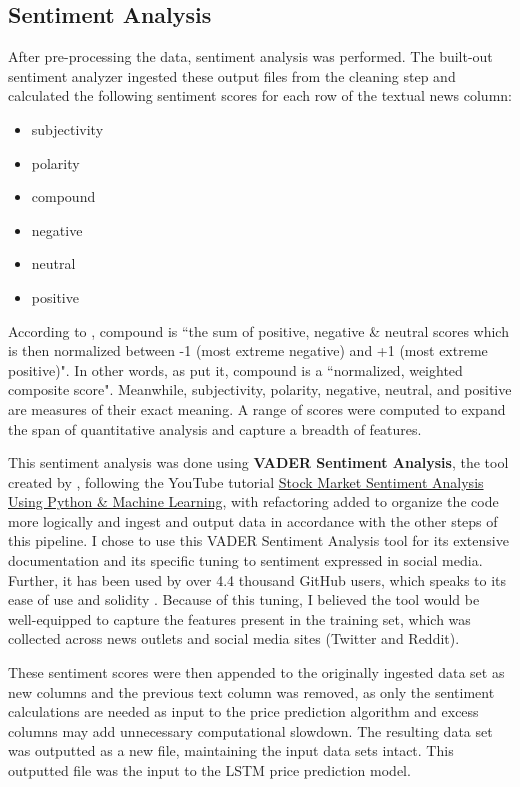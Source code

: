 \documentclass[10pt,twocolumn]{article}
\begin{document}
\subsection{Sentiment Analysis}

After pre-processing the data, sentiment analysis was performed. The built-out sentiment analyzer ingested these output files from the cleaning step and calculated the following sentiment scores for each row of the textual news column:

\begin{itemize}
    \item subjectivity
    \item polarity
    \item compound
    \item negative
    \item neutral
    \item positive
\end{itemize}

\noindent According to \textcite{sentimentanalysis}, compound is ``the sum of positive, negative \& neutral scores which is then normalized between -1 (most extreme negative) and +1 (most extreme positive)". In other words, as \textcite{vadersentiment} put it, compound is a ``normalized, weighted composite score". Meanwhile, subjectivity, polarity, negative, neutral, and positive are measures of their exact meaning. A range of scores were computed to expand the span of quantitative analysis and capture a breadth of features.

This sentiment analysis was done using \textbf{VADER Sentiment Analysis}, the tool created by \textcite{vadersentiment}, following the YouTube tutorial \href{https://www.youtube.com/watch?v=4OlvGGAsj8I}{Stock Market Sentiment Analysis Using Python \& Machine Learning}, with refactoring added to organize the code more logically and ingest and output data in accordance with the other steps of this pipeline. I chose to use this VADER Sentiment Analysis tool for its extensive documentation and its specific tuning to sentiment expressed in social media. Further, it has been used by over 4.4 thousand GitHub users, which speaks to its ease of use and solidity \cite{vadersentiment}. Because of this tuning, I believed the tool would be well-equipped to capture the features present in the training set, which was collected across news outlets and social media sites (Twitter and Reddit).

These sentiment scores were then appended to the originally ingested data set as new columns and the previous text column was removed, as only the sentiment calculations are needed as input to the price prediction algorithm and excess columns may add unnecessary computational slowdown. The resulting data set was outputted as a new file, maintaining the input data sets intact. This outputted file was the input to the LSTM price prediction model.
\end{document}
